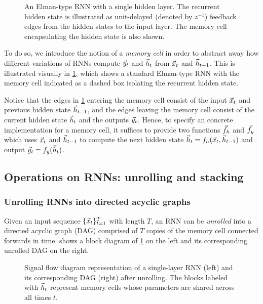 \begin{figure}[tb]
  \centering
  
  \caption{An Elman-type RNN with a single hidden layer. The recurrent hidden
    state is illustrated as unit-delayed (denoted by $z^{-1}$) feedback edges
    from the hidden states to the input layer. The memory cell encapsulating the
  hidden state is also shown.}
  \label{fig:rnn-elman}
\end{figure}

To do so, we introduce the notion of a \emph{memory cell} in order to abstract
away how different variations of RNNs compute $\vec{y}_t$ and $\vec{h}_t$ from $\vec{x}_t$ and
$\vec{h}_{t-1}$. This is illustrated visually in \cref{fig:rnn-elman}, which shows a
standard Elman-type RNN \citep{elman1990finding} with the memory cell indicated
as a dashed box isolating the recurrent hidden state.

Notice that the edges in \cref{fig:rnn-elman} entering the memory cell
consist of the input $\vec{x}_t$ and previous hidden state $\vec{h}_{t-1}$,
and the edges leaving the memory cell consist of the current hidden state $\vec{h}_t$
and the outputs $\vec{y}_t$. Hence, to specify an concrete implementation for a
memory cell, it suffices to provide two functions $\vec{f}_h$ and $\vec{f}_y$ which
uses $\vec{x}_t$ and $\vec{h}_{t-1}$ to compute the next hidden state $\vec{h}_t = f_h(\vec{x}_t,
\vec{h}_{t-1})$ and output $\vec{y}_t = f_y(\vec{h}_t)$.

\subsection{Operations on RNNs: unrolling and stacking}

\subsubsection{Unrolling RNNs into directed acyclic graphs}


Given an input sequence $\{\vec{x}_{t}\}_{t=1}^T$ with length $T$, an RNN can be
\emph{unrolled} into a directed acyclic graph (DAG) comprised of $T$ copies of the
memory cell connected forwards in time.  shows
a block diagram of \cref{fig:rnn-elman} on the left and its corresponding unrolled
DAG on the right.

\begin{figure}[tb]
  \centering
  \resizebox{4.5in}{!}{}
  \caption{Signal flow diagram representation of a single-layer RNN (left) and its
    corresponding DAG (right) after unrolling. The blocks labeled
    with $\vec{h}_t$ represent memory cells whose parameters are shared across all times
  $t$.}
  \label{fig:rnn-single-unrolled}
\end{figure}

